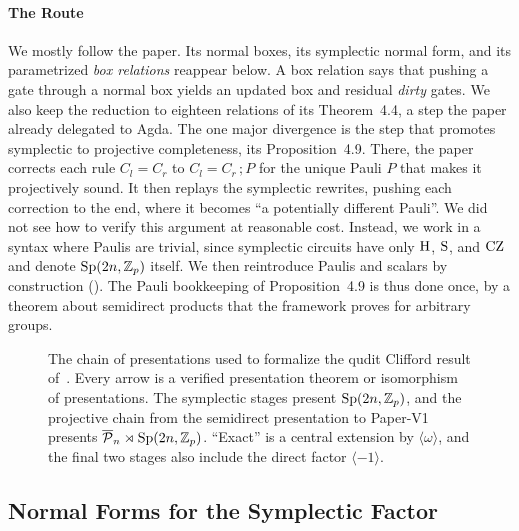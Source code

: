 \documentclass[acmsmall,screen,nonacm]{acmart}
\begin{document}
\paragraph{The Route} We mostly follow the paper. Its normal boxes, its symplectic normal form, and its parametrized \emph{box relations} reappear below. A box relation says that pushing a gate through a normal box yields an updated box and residual \emph{dirty} gates. We also keep the reduction to eighteen relations of its Theorem~4.4, a step the paper already delegated to Agda. The one major divergence is the step that promotes symplectic to projective completeness, its Proposition~4.9. There, the paper corrects each rule $C_l = C_r$ to $C_l = C_r\,;P$ for the unique Pauli $P$ that makes it projectively sound. It then replays the symplectic rewrites, pushing each correction to the end, where it becomes ``a potentially different Pauli''. We did not see how to verify this argument at reasonable cost. Instead, we work in a syntax where Paulis are trivial, since symplectic circuits have only $\mathrm{H}$, $\mathrm{S}$, and $\mathrm{CZ}$ and denote $\mathrm{Sp}(2n,\mathbb{Z}_p)$ itself. We then reintroduce Paulis and scalars by construction (). The Pauli bookkeeping of Proposition~4.9 is thus done once, by a theorem about semidirect products that the framework proves for arbitrary groups.

\begin{figure}[tbp]
\centering
\unskip
\caption{The chain of presentations used to formalize the qudit Clifford result of~\quditcite{}. Every arrow is a verified presentation theorem or isomorphism of presentations. The symplectic stages present $\mathrm{Sp}(2n,\mathbb{Z}_p)$, and the projective chain from the semidirect presentation to Paper-V1 presents $\overline{\mathcal{P}}_{n}\rtimes\mathrm{Sp}(2n,\mathbb{Z}_p)$. ``Exact'' is a central extension by $\langle\omega\rangle$, and the final two stages also include the direct factor $\langle-1\rangle$.}
\label{fig:q-route-details}
\end{figure}

\subsection{Normal Forms for the Symplectic Factor}\label{app:q-symplectic}
\end{document}
